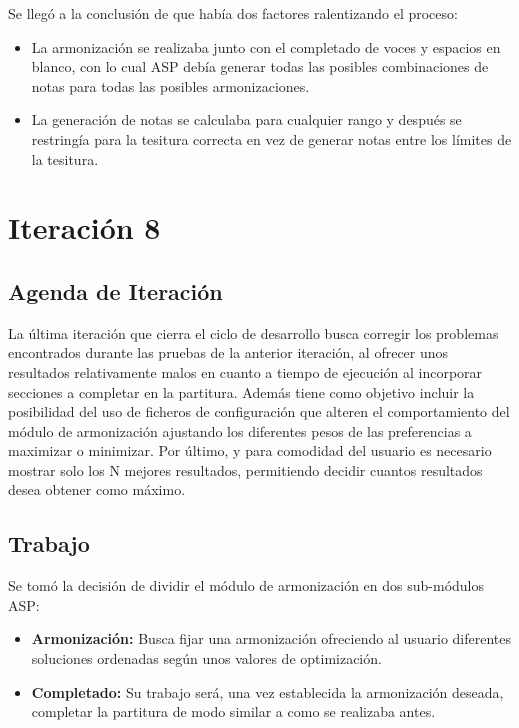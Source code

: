 Se llegó a la conclusión de que había dos factores ralentizando el proceso:
\begin{itemize}
	\item La armonización se realizaba junto con el completado de voces y espacios en blanco, con lo cual ASP debía generar todas las posibles combinaciones de notas para todas las posibles armonizaciones.
	\item La generación de notas se calculaba para cualquier rango y después se restringía para la tesitura correcta en vez de generar notas entre los límites de la tesitura. 
\end{itemize}

\section{Iteración 8}
\label{sec:eighth_iteration}
\subsection{Agenda de Iteración}
\label{subsec:eighth_iteration_backlog}
La última iteración que cierra el ciclo de desarrollo busca corregir los problemas encontrados durante las pruebas de la anterior iteración, al ofrecer unos resultados relativamente malos en cuanto a tiempo de ejecución al incorporar secciones a completar en la partitura. Además tiene como objetivo incluir la posibilidad del uso de ficheros de configuración que alteren el comportamiento del módulo de armonización ajustando los diferentes pesos de las preferencias a maximizar o minimizar. Por último, y para comodidad del usuario es necesario mostrar solo los N mejores resultados, permitiendo decidir cuantos resultados desea obtener como máximo.

\subsection{Trabajo}
\label{subsec:eighth_iteration_work}
Se tomó la decisión de dividir el módulo de armonización en dos sub-módulos ASP:
\begin{itemize}
	\item \textbf{Armonización:} Busca fijar una armonización ofreciendo al usuario diferentes soluciones ordenadas según unos valores de optimización.
	\item \textbf{Completado:} Su trabajo será, una vez establecida la armonización deseada, completar la partitura de modo similar a como se realizaba antes.
\end{itemize}

